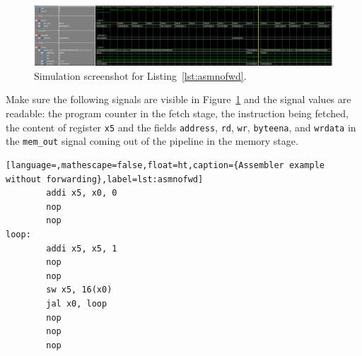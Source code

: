 \documentclass[11pt,a4paper,titlepage,oneside]{article}
\begin{document}
\maketitle


\begin{figure}[ht!]
  \centering
  \includegraphics[width=1.0\linewidth]{timing_submission.png}
  \caption{Simulation screenshot for Listing~\ref{lst:asmnofwd}.}
  \label{fig:sim}
\end{figure}

Make sure the following signals are visible in Figure~\ref{fig:sim} and the 
signal values are readable:
the program counter in the fetch stage, the instruction being fetched, the 
content of register \texttt{x5} and the fields \texttt{address}, \texttt{rd}, 
\texttt{wr}, \texttt{byteena}, and \texttt{wrdata} in the \texttt{mem\_out} 
signal coming out of the pipeline in the memory stage.

\begin{lstlisting}[language=,mathescape=false,float=ht,caption={Assembler example without forwarding},label=lst:asmnofwd]
        addi x5, x0, 0
        nop
        nop
loop:
        addi x5, x5, 1
        nop
        nop
        sw x5, 16(x0)
        jal x0, loop
        nop
        nop
        nop
\end{lstlisting}
\end{document}
